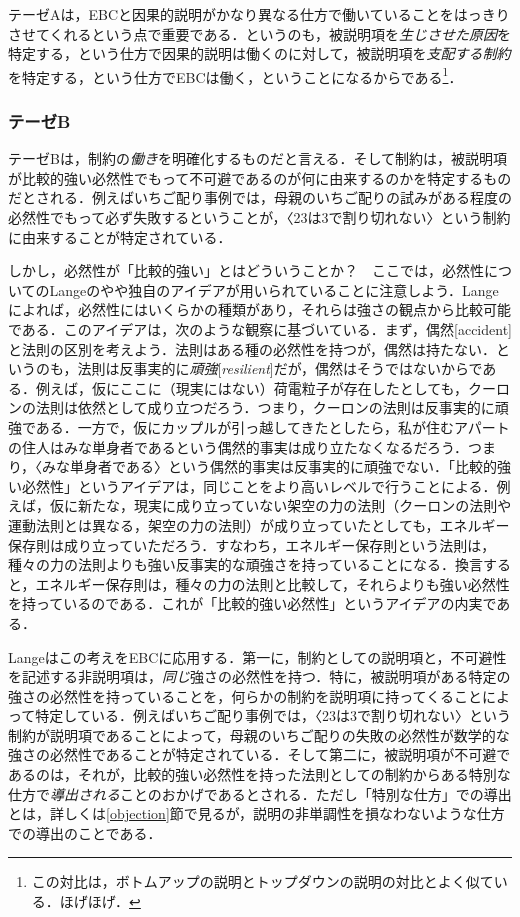 \documentclass[dvipdfmx,twoside,11pt,uplatex]{jsarticle}
\newcommand{\myterm}[2]{{\emph{#1}}{[\emph{#2}]}}
\theoremstyle{definition}
\begin{document}
テーゼAは，EBCと因果的説明がかなり異なる仕方で働いていることをはっきりさせてくれるという点で重要である．というのも，被説明項を\emph{生じさせた原因}を特定する，という仕方で因果的説明は働くのに対して，被説明項を\emph{支配する制約}を特定する，という仕方でEBCは働く，ということになるからである\footnote{
この対比は，ボトムアップの説明とトップダウンの説明の対比とよく似ている\citep{kitcher1985two}．ほげほげ．
}．

\subsubsection{テーゼB}\label{b}
テーゼBは，制約の\emph{働き}を明確化するものだと言える．そして制約は，被説明項が比較的強い必然性でもって不可避であるのが何に由来するのかを特定するものだとされる．例えばいちご配り事例では，母親のいちご配りの試みがある程度の必然性でもって必ず失敗するということが，〈23は3で割り切れない〉という制約に由来することが特定されている．

しかし，必然性が「比較的強い」とはどういうことか？　ここでは，必然性についてのLangeのやや独自のアイデアが用いられていることに注意しよう．Langeによれば，必然性にはいくらかの種類があり，それらは強さの観点から比較可能である．このアイデアは，次のような観察に基づいている．まず，偶然[accident]と法則の区別を考えよう．法則はある種の必然性を持つが，偶然は持たない．というのも，法則は反事実的に\myterm{頑強}{resilient}だが，偶然はそうではないからである．例えば，仮にここに（現実にはない）荷電粒子が存在したとしても，クーロンの法則は依然として成り立つだろう．つまり，クーロンの法則は反事実的に頑強である．一方で，仮にカップルが引っ越してきたとしたら，私が住むアパートの住人はみな単身者であるという偶然的事実は成り立たなくなるだろう．つまり，〈みな単身者である〉という偶然的事実は反事実的に頑強でない．「比較的強い必然性」というアイデアは，同じことをより高いレベルで行うことによる．例えば，仮に新たな，現実に成り立っていない架空の力の法則（クーロンの法則や運動法則とは異なる，架空の力の法則）が成り立っていたとしても，エネルギー保存則は成り立っていただろう．すなわち，エネルギー保存則という法則は，種々の力の法則よりも強い反事実的な頑強さを持っていることになる．換言すると，エネルギー保存則は，種々の力の法則と比較して，それらよりも強い必然性を持っているのである\citep[Ch. 1]{lange2009lawmakers}．これが「比較的強い必然性」というアイデアの内実である．

Langeはこの考えをEBCに応用する．第一に，制約としての説明項と，不可避性を記述する非説明項は，\emph{同じ}強さの必然性を持つ．特に，被説明項がある特定の強さの必然性を持っていることを，何らかの制約を説明項に持ってくることによって特定している\citep[25]{lange2016bwc}．例えばいちご配り事例では，〈23は3で割り切れない〉という制約が説明項であることによって，母親のいちご配りの失敗の必然性が数学的な強さの必然性であることが特定されている．そして第二に，被説明項が不可避であるのは，それが，比較的強い必然性を持った法則としての制約からある特別な仕方で\emph{導出される}ことのおかげであるとされる\citep[28--33]{Lange2018bwcsum}．ただし「特別な仕方」での導出とは，詳しくは\ref{objection}節で見るが，説明の非単調性を損なわないような仕方での導出のことである．
\end{document}

